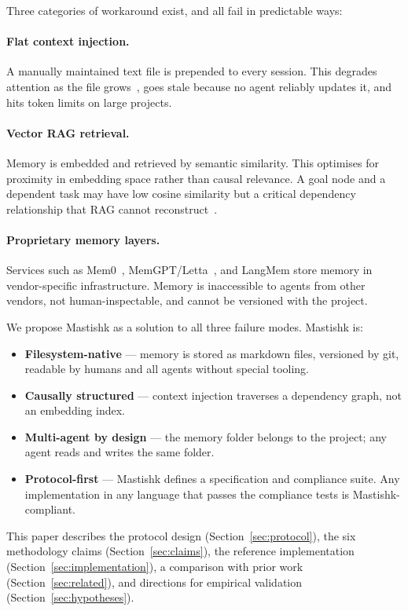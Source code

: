 \documentclass[11pt]{article}
\begin{document}
Three categories of workaround exist, and all fail in predictable ways:

\paragraph{Flat context injection.} A manually maintained text file is prepended to every session. This degrades attention as the file grows~\cite{liu2023lost}, goes stale because no agent reliably updates it, and hits token limits on large projects.

\paragraph{Vector RAG retrieval.} Memory is embedded and retrieved by semantic similarity. This optimises for proximity in embedding space rather than causal relevance. A goal node and a dependent task may have low cosine similarity but a critical dependency relationship that RAG cannot reconstruct~\cite{edge2024local}.

\paragraph{Proprietary memory layers.} Services such as Mem0~\cite{mem0}, MemGPT/Letta~\cite{packer2023memgpt}, and LangMem store memory in vendor-specific infrastructure. Memory is inaccessible to agents from other vendors, not human-inspectable, and cannot be versioned with the project.

We propose Mastishk as a solution to all three failure modes. Mastishk is:

\begin{itemize}
  \item \textbf{Filesystem-native} --- memory is stored as markdown files, versioned by git, readable by humans and all agents without special tooling.
  \item \textbf{Causally structured} --- context injection traverses a dependency graph, not an embedding index.
  \item \textbf{Multi-agent by design} --- the memory folder belongs to the project; any agent reads and writes the same folder.
  \item \textbf{Protocol-first} --- Mastishk defines a specification and compliance suite. Any implementation in any language that passes the compliance tests is Mastishk-compliant.
\end{itemize}

This paper describes the protocol design (Section~\ref{sec:protocol}), the six methodology claims (Section~\ref{sec:claims}), the reference implementation (Section~\ref{sec:implementation}), a comparison with prior work (Section~\ref{sec:related}), and directions for empirical validation (Section~\ref{sec:hypotheses}).
\end{document}

